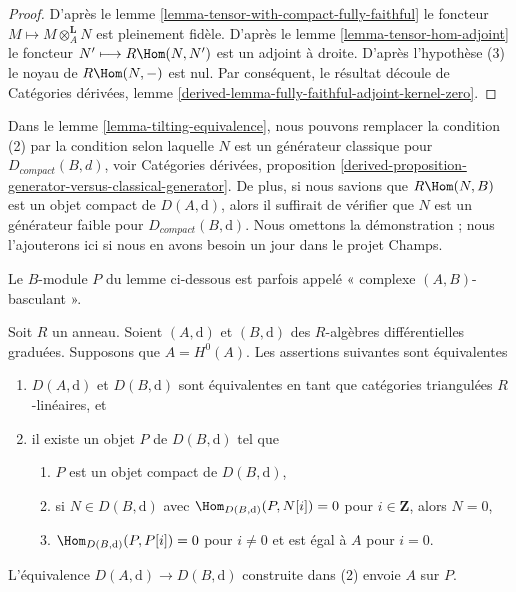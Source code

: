 \begin{proof}
D'après le lemme
\ref{lemma-tensor-with-compact-fully-faithful} le foncteur $M \longmapsto M \otimes_A^\mathbf{L} N$ est
pleinement fidèle. D'après le lemme
\ref{lemma-tensor-hom-adjoint} le foncteur $N' \longmapsto R\Hom(N, N')$ est un adjoint à droite.
D'après l'hypothèse (3) le noyau de $R\Hom(N, -)$ est nul. Par
conséquent, le résultat découle
de Catégories dérivées, lemme
\ref{derived-lemma-fully-faithful-adjoint-kernel-zero}.
\end{proof}

\begin{remark}
\label{remark-tilting-equivalence}
Dans le lemme \ref{lemma-tilting-equivalence}, nous pouvons
remplacer la condition (2) par la condition selon laquelle $N$ est un
générateur classique pour $D_{compact}(B,
d)$, voir Catégories dérivées,
proposition \ref{derived-proposition-generator-versus-classical-generator}. De plus,
si nous savions que $R\Hom(N, B)$ est un objet compact de $D(A,
\text{d})$, alors il suffirait de vérifier que $N$ est un générateur
faible pour $D_{compact}(B, \text{d})$. Nous omettons la
démonstration ; nous l'ajouterons ici si nous en avons besoin un
jour dans le projet Champs.
\end{remark}

\noindent
Le $B$-module $P$ du lemme ci-dessous est parfois appelé
« complexe $(A, B)$-basculant ».

\begin{lemma}
\label{lemma-rickard}
Soit $R$ un anneau. Soient $(A, \text{d})$ et $(B, \text{d})$ des
$R$-algèbres différentielles graduées. Supposons que $A = H^0(A)$. Les
assertions suivantes sont équivalentes
\begin{enumerate}
\item $D(A, \text{d})$ et $D(B, \text{d})$ sont équivalentes en tant que
catégories triangulées $R$-linéaires, et
\item il existe un objet $P$ de $D(B, \text{d})$ tel que
\begin{enumerate}
\item $P$ est un objet compact de $D(B, \text{d})$,
\item si $N \in D(B, \text{d})$ avec $\Hom_{D(B, \text{d})}(P, N[i]) = 0$
pour $i \in \mathbf{Z}$, alors $N = 0$,
\item $\Hom_{D(B, \text{d})}(P, P[i]) = 0$ pour $i \not = 0$ et
est égal à $A$ pour $i = 0$.
\end{enumerate}
\end{enumerate}
L'équivalence $D(A, \text{d}) \to D(B, \text{d})$
construite dans (2) envoie $A$ sur $P$.
\end{lemma}

